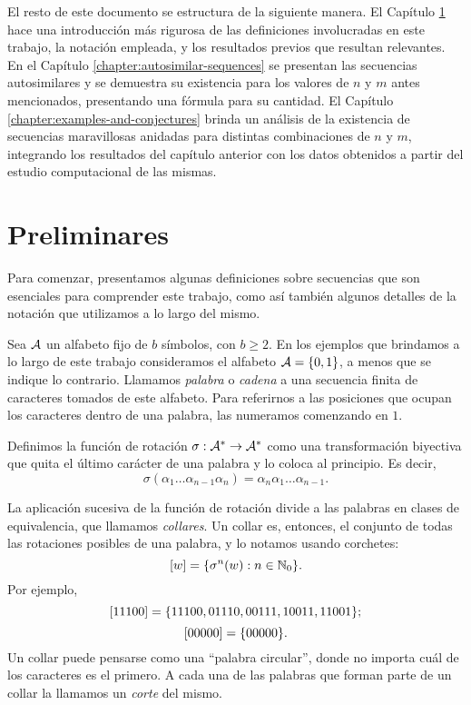 El resto de este documento se estructura de la siguiente manera. El Capítulo
\ref{chapter:preliminaries} hace una introducción más rigurosa de las definiciones
involucradas en este trabajo, la notación empleada, y los resultados previos
que resultan relevantes. En el Capítulo \ref{chapter:autosimilar-sequences}
se presentan las secuencias autosimilares y se demuestra su existencia para
los valores de $n$ y $m$ antes mencionados, presentando una fórmula para su
cantidad. El Capítulo \ref{chapter:examples-and-conjectures} brinda un
análisis de la existencia de secuencias maravillosas anidadas para distintas
combinaciones de $n$ y $m$, integrando los resultados del capítulo anterior
con los datos obtenidos a partir del estudio computacional de las mismas.

\newpage

\chapter{Preliminares}
\label{chapter:preliminaries}

Para comenzar, presentamos algunas definiciones sobre secuencias que son
esenciales para comprender este trabajo, como así también algunos detalles
de la notación que utilizamos a lo largo del mismo.

Sea $\mathcal{A}$ un alfabeto fijo de $b$ símbolos, con $b \geq 2$. En los
ejemplos que brindamos a lo largo de este trabajo consideramos el alfabeto
$\mathcal{A} = \lbrace 0, 1 \rbrace$, a menos que se indique lo contrario.
Llamamos \emph{palabra} o \emph{cadena} a una secuencia finita de caracteres
tomados de este alfabeto.
Para referirnos a las posiciones que ocupan los caracteres dentro de una
palabra, las numeramos comenzando en $1$.

Definimos la función de rotación $\sigma: \mathcal{A}^* \to \mathcal{A}^*$ como
una transformación biyectiva que quita el último carácter de una palabra y lo
coloca al principio. Es decir,
\[ \sigma(\alpha_1\dots\alpha_{n-1}\alpha_n) =
	\alpha_n\alpha_1\dots\alpha_{n-1}. \]

La aplicación sucesiva de la función de rotación divide a las palabras en clases
de equivalencia, que llamamos \emph{collares}. Un collar es, entonces, el
conjunto de todas las rotaciones posibles de una palabra, y lo notamos usando
corchetes:
\[ \left[w\right] = \lbrace \sigma^{n}(w) : n \in \mathbb{N}_0 \rbrace. \]
Por ejemplo,
\[ \left[11100\right] = \lbrace 11100, 01110, 00111, 10011, 11001 \rbrace; \]
\[ \left[00000\right] = \lbrace 00000 \rbrace. \]
Un collar puede pensarse como una ``palabra circular'', donde no importa
cuál de los caracteres es el primero. A cada una de las palabras que forman
parte de un collar la llamamos un \emph{corte} del mismo.

